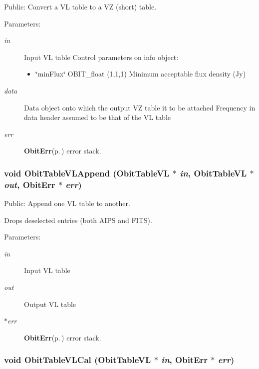 Public: Convert a VL table to a VZ (short) table. 

\begin{Desc}
\item[Parameters:]
\begin{description}
\item[{\em in}]Input VL table Control parameters on info object: \begin{itemize}
\item \char`\"{}min\-Flux\char`\"{} OBIT\_\-float (1,1,1) Minimum acceptable flux density (Jy) \end{itemize}
\item[{\em data}]Data object onto which the output VZ table it to be attached Frequency in data header assumed to be that of the VL table \item[{\em err}]{\bf Obit\-Err}{\rm (p.\,\pageref{structObitErr})} error stack. \end{description}
\end{Desc}
\subsubsection{\setlength{\rightskip}{0pt plus 5cm}void Obit\-Table\-VLAppend ({\bf Obit\-Table\-VL} $\ast$ {\em in}, {\bf Obit\-Table\-VL} $\ast$ {\em out}, {\bf Obit\-Err} $\ast$ {\em err})}\label{ObitTableVLUtil_8c_a8}


Public: Append one VL table to another. 

Drops deselected entries (both AIPS and FITS). \begin{Desc}
\item[Parameters:]
\begin{description}
\item[{\em in}]Input VL table \item[{\em out}]Output VL table \item[{\em $\ast$err}]{\bf Obit\-Err}{\rm (p.\,\pageref{structObitErr})} error stack. \end{description}
\end{Desc}
\subsubsection{\setlength{\rightskip}{0pt plus 5cm}void Obit\-Table\-VLCal ({\bf Obit\-Table\-VL} $\ast$ {\em in}, {\bf Obit\-Err} $\ast$ {\em err})}\label{ObitTableVLUtil_8c_a16}


